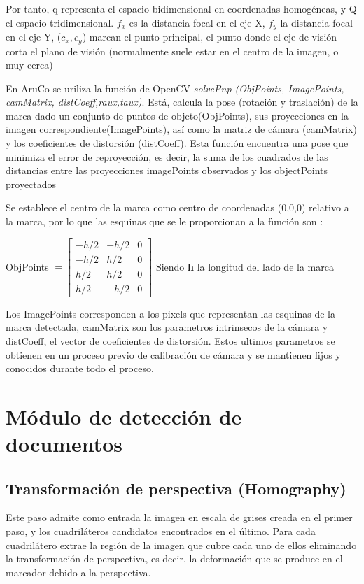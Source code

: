 Por tanto, q representa el espacio bidimensional en coordenadas homogéneas, y Q el espacio tridimensional. $f_{x}$ es la distancia focal en el eje X, $f_{y}$ la distancia focal en el eje Y, ($c_{x},c_{y}$) marcan el punto principal, el punto donde el eje de visión corta el plano de visión (normalmente suele estar en el centro de la imagen, o muy cerca) 

En AruCo se uriliza la función de OpenCV \textit{solvePnp (ObjPoints, ImagePoints, camMatrix, distCoeff,raux,taux)}.   Está, calcula la pose (rotación y traslación) de la marca dado un conjunto de puntos de objeto(ObjPoints), sus proyecciones en la imagen correspondiente(ImagePoints), así como la matriz de cámara (camMatrix) y los coeficientes de distorsión (distCoeff). Esta función encuentra una pose que minimiza el error de reproyección, es decir, la suma de los cuadrados de las distancias entre las proyecciones imagePoints observados y los objectPoints proyectados

Se establece el centro de la marca como centro de coordenadas (0,0,0) relativo a la marca, por lo que las esquinas que se le proporcionan a la función son :
\begin{center}
ObjPoints $=\begin{bmatrix} -h/2 & -h/2 & 0 \\
                 -h/2 &  h/2 & 0 \\
                  h/2 &  h/2 & 0 \\
                  h/2 & -h/2 & 0   
\end{bmatrix}$
Siendo \textbf{h} la longitud del lado de la marca
\end{center}
Los ImagePoints corresponden a los pixels que representan las esquinas de la marca detectada, camMatrix son los parametros intrinsecos de la cámara y distCoeff, el vector de coeficientes de distorsión. Estos ultimos parametros se obtienen  en un proceso previo de calibración de cámara y se mantienen fijos y conocidos durante todo el proceso.




\section{Módulo de detección de documentos}
\subsection{Transformación de perspectiva (Homography)}
Este paso admite como entrada la imagen en escala de grises creada en el primer paso, y los cuadriláteros candidatos encontrados en el último. Para cada cuadrilátero extrae la región de la imagen que cubre cada uno de ellos eliminando la transformación de perspectiva, es decir, la deformación que se produce en el marcador debido a la perspectiva.

